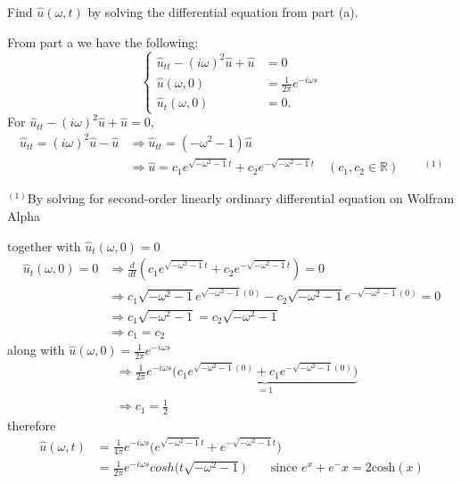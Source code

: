 \documentclass[12pt]{article}
\newcommand{\R}{\mathbb{R}}
\newcommand{\lra}{\Longrightarrow}
\newenvironment{subproblem}[2][Part]{\begin{trivlist}
  \item[\hskip \labelsep {\bfseries #1}\hskip \labelsep {\bfseries (#2)}]}{\end{trivlist}}
\newenvironment{solution}[1][Solution]{\begin{trivlist}
  \item[\hskip \labelsep {\bfseries #1} \hskip \labelsep]}{\end{trivlist}}
\theoremstyle{remark}
\begin{document}
\begin{subproblem}{b}
  Find \(\hat{u}(\omega,t)\) by solving the differential equation from part (a).
\end{subproblem}
\begin{solution}
  From part a we have the following:
  \[
    \left\{
      \begin{array}{ll}
        \hat{u}_{tt} - (i\omega)^2\hat{u} + \hat{u} &= 0 \\
        \hat{u}(\omega,0) &= \frac{1}{2\pi}e^{-i\omega s} \\
        \hat{u}_t(\omega,0) &= 0.
      \end{array}
    \right.
  \]
  For \(\hat{u}_{tt} - (i\omega)^2\hat{u} + \hat{u} = 0\),
  \begin{align*}
    \hat{u}_{tt} = (i\omega)^2\hat{u} - \hat{u} &\lra \hat{u}_{tt} = (-\omega^2 - 1)\hat{u} \\
                                                &\lra \hat{u} = c_1e^{\sqrt{-\omega^2-1}t}+
                                                  c_2e^{-\sqrt{-\omega^2-1}t}
                                                  \quad (c_1,c_2 \in \R)\qquad^{(1)}
  \end{align*}
  \begin{footnotesize}
    \(^{(1)}\)By solving for second-order linearly ordinary differential
    equation on Wolfram Alpha \\
  \end{footnotesize}
  $ $\\
  together with \(\hat{u}_t(\omega,0) = 0\)
  \begin{align*}
    \hat{u}_t(\omega,0) = 0 &\lra \frac{d}{dt}(c_1e^{\sqrt{-\omega^2-1}t}+ c_2e^{-\sqrt{-\omega^2-1}t}) = 0\\
                            &\lra c_1\sqrt{-\omega^2-1}e^{\sqrt{-\omega^2-1}(0)} -
                              c_2\sqrt{-\omega^2-1}e^{-\sqrt{-\omega^2-1}(0)} = 0 \\
                            &\lra c_1\sqrt{-\omega^2-1} = c_2\sqrt{-\omega^2-1} \\
                            &\lra c_1 = c_2
  \end{align*}
  along with \(\hat{u}(\omega,0) = \frac{1}{2\pi}e^{-i\omega s}\)
  \begin{align*}
    &\lra \frac{1}{2\pi}e^{-i\omega s} \underbrace{\bigg(c_1e^{\sqrt{-\omega^2-1}(0)}+
      c_1e^{-\sqrt{-\omega^2-1}(0)} \bigg)}_{= 1} \\
    &\lra c_1 = \frac{1}{2}
  \end{align*}
  therefore
  \begin{align*}
    \hat{u}(\omega,t) &= \frac{1}{4\pi}e^{-i\omega s}\bigg(e^{\sqrt{-\omega^2-1}t}+
                        e^{-\sqrt{-\omega^2-1}t} \bigg) \\
                      &= \boxed{\frac{1}{2\pi}e^{-i\omega s}cosh\big(t\sqrt{-\omega^2-1} \big)}
                        \qquad \text{since } e^x + e^-x = 2\text{cosh}(x)\\
  \end{align*}
\end{solution}
\end{document}
